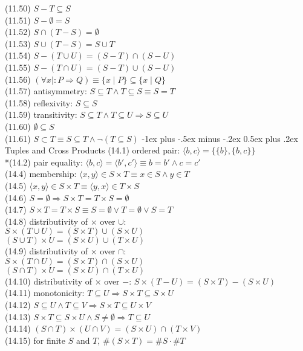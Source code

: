 \documentclass[10pt,landscape]{article}
\makeatletter
\renewcommand{\section}{\@startsection{section}{1}{0mm}%
                                {-1ex plus -.5ex minus -.2ex}%
                                {0.5ex plus .2ex}%
                                {\normalfont\small\bfseries}}
\makeatother
\begin{document}
\begin{multicols}{3}
{(11.50) $S-T\subseteq S$\\
(11.51) $S-\emptyset = S$\\
(11.52) $S\cap (T-S)=\emptyset$\\
(11.53) $S\cup (T-S)=S\cup T$\\
(11.54) $S-(T\cup U)=(S-T)\cap (S-U)$\\
(11.55) $S-(T\cap U)=(S-T)\cup (S-U)$\\
(11.56) $(\forall x\mid: P\Rightarrow Q)\equiv \{x\mid P\}\subseteq \{x\mid Q\}$\\
(11.57) antisymmetry: $S\subseteq T\land T\subseteq S\equiv S=T$\\
(11.58) reflexivity: $S\subseteq S$\\
(11.59) transitivity: $S\subseteq T\land T\subseteq U\Rightarrow S\subseteq U$\\
(11.60) $\emptyset\subseteq S$\\
(11.61) $S\subset T\equiv S\subseteq T\land \neg(T\subseteq S)$
\section{Tuples and Cross Products}
(14.1) ordered pair: $\langle b,c\rangle=\{\{b\}, \{b,c\}\}$\\
*(14.2) pair equality: $\langle b,c\rangle=\langle b',c'\rangle\equiv b=b'\land c=c'$\\
(14.4) membership: $\langle x,y\rangle\in S\times T\equiv x\in S\land y\in T$\\
(14.5) $\langle x,y\rangle\in S\times T\equiv \langle y,x\rangle \in T\times S$\\
(14.6) $S=\emptyset \Rightarrow S\times T = T\times S = \emptyset$\\
(14.7) $S\times T=T\times S\equiv S=\emptyset\lor T=\emptyset \lor S=T$\\
(14.8) distributivity of $\times$ over $\cup$:\\
\qquad $S\times (T\cup U)=(S\times T)\cup (S\times U)$\\
\qquad $(S\cup T)\times U=(S\times U)\cup (T\times U)$\\
(14.9) distributivity of $\times$ over $\cap$:\\
\qquad $S\times (T\cap U)=(S\times T)\cap (S\times U)$\\
\qquad $(S\cap T)\times U=(S\times U)\cap (T\times U)$\\
(14.10) distributivity of $\times$ over $-$: $S\times (T-U)=(S\times T)-(S\times U)$\\
(14.11) monotonicity: $T\subseteq U\Rightarrow S\times T\subseteq S\times U$\\
(14.12) $S\subseteq U\land T\subseteq V\Rightarrow S\times T\subseteq U\times V$\\
(14.13) $S\times T\subseteq S\times U\land S\neq \emptyset \Rightarrow T\subseteq U$\\
(14.14) $(S\cap T)\times (U\cap V)=(S\times U)\cap (T\times V)$\\
(14.15) for finite $S$ and $T$, $\#(S\times T)=\#S\cdot \#T$
}
\end{multicols}
\end{document}
